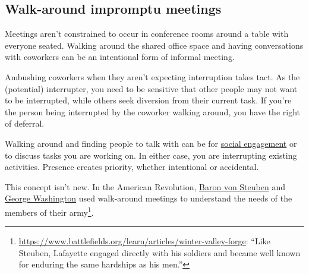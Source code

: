 \subsection*{Walk-around impromptu meetings\label{sec:walk-arounds}}

Meetings aren't constrained to occur in conference rooms around a table with everyone seated. Walking around the shared office space and having conversations with coworkers can be an intentional form of informal meeting. 

Ambushing coworkers when they aren't expecting interruption takes tact. As the (potential) interrupter, you need to be sensitive that other people may not want to be interrupted, while others seek diversion from their current task. If you're the person being interrupted by the coworker walking around, you have the right of deferral. 


Walking around and finding people to talk with can be for 
\hyperref[sec:socializing]{social engagement} 
or to discuss tasks you are working on. 
In either case, you are interrupting existing activities. Presence creates priority,
whether intentional or accidental.





This concept isn't new. 
In the American Revolution, \href{https://en.wikipedia.org/wiki/Friedrich_Wilhelm_von_Steuben}{Baron von Steuben}
\iftoggle{WPinmargin}{\marginpar{[Wikipedia] Baron\\ von Steuben}}{}
and 
\href{https://en.wikipedia.org/wiki/George_Washington}{George Washington}
used walk-around meetings to understand the needs of the members of their army\footnote{\href{https://www.battlefields.org/learn/articles/winter-valley-forge}{https://www.battlefields.org/learn/articles/winter-valley-forge}: ``Like Steuben, Lafayette engaged directly with his soldiers and became well known for enduring the same hardships as his men.''}.
